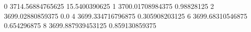 0 3714.56884765625 15.5400390625
1 3700.01708984375 0.98828125
2 3699.02880859375 0.0
4 3699.334716796875 0.305908203125
6 3699.68310546875 0.654296875
8 3699.887939453125 0.859130859375
